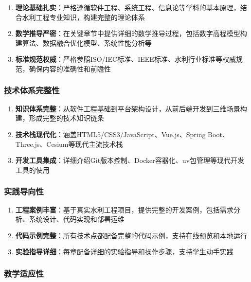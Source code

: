 \begin{enumerate}
\def\labelenumi{\arabic{enumi}.}
\tightlist
\item
  \textbf{理论基础扎实}：严格遵循软件工程、系统工程、信息论等学科的基本原理，结合水利工程专业知识，构建完整的理论体系
\item
  \textbf{数学推导严密}：在关键章节中提供详细的数学推导过程，包括数字高程模型构建算法、数据融合优化模型、系统性能分析等
\item
  \textbf{标准规范权威}：严格参照ISO/IEC标准、IEEE标准、水利行业标准等权威规范，确保内容的准确性和前瞻性
\end{enumerate}

\subsubsection{技术体系完整性}\label{ux6280ux672fux4f53ux7cfbux5b8cux6574ux6027}

\begin{enumerate}
\def\labelenumi{\arabic{enumi}.}
\setcounter{enumi}{3}
\tightlist
\item
  \textbf{知识体系完整}：从软件工程基础到平台架构设计，从前后端开发到三维场景构建，形成完整的技术知识链条
\item
  \textbf{技术栈现代化}：涵盖HTML5/CSS3/JavaScript、Vue.js、Spring Boot、Three.js、Cesium等现代主流技术栈
\item
  \textbf{开发工具集成}：详细介绍Git版本控制、Docker容器化、uv包管理等现代开发工具的使用
\end{enumerate}

\subsubsection{实践导向性}\label{ux5b9eux8df5ux5bfcux5411ux6027}

\begin{enumerate}
\def\labelenumi{\arabic{enumi}.}
\setcounter{enumi}{6}
\tightlist
\item
  \textbf{工程案例丰富}：基于真实水利工程项目，提供完整的开发案例，包括需求分析、系统设计、代码实现和部署运维
\item
  \textbf{代码示例完整}：所有技术点都配备完整的代码示例，支持在线预览和本地运行
\item
  \textbf{实验指导详细}：每章配备详细的实验指导和操作步骤，支持学生动手实践
\end{enumerate}

\subsubsection{教学适应性}\label{ux6559ux5b66ux9002ux5e94ux6027}

